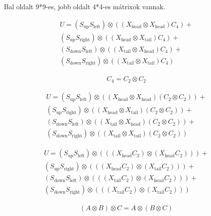 Bal oldalt 9*9-es, jobb oldalt 4*4-es mátrixok vannak.

\begin{align}
  U =
  (S_{\text{up}}  S_{\text{left}}) \otimes ((X_{\text{head}} \otimes X_{\text{head}})  C_4) +   \\
  (S_{\text{up}}  S_{\text{right}}) \otimes ((X_{\text{head}} \otimes X_{\text{tail}}) C_4) +   \\
  (S_{\text{down}}  S_{\text{left}}) \otimes ((X_{\text{tail}} \otimes X_{\text{head}})  C_4) + \\
  (S_{\text{down}}  S_{\text{right}}) \otimes ((X_{\text{tail}} \otimes X_{\text{tail}}) C_4)
\end{align}

\begin{align}
  C_4 = C_2 \otimes C_2
\end{align}

\begin{align}
  U =
  (S_{\text{up}}  S_{\text{left}}) \otimes ((X_{\text{head}} \otimes X_{\text{head}}) (C_2 \otimes C_2)) +   \\
  (S_{\text{up}}  S_{\text{right}}) \otimes ((X_{\text{head}} \otimes X_{\text{tail}}) (C_2 \otimes C_2)) +  \\
  (S_{\text{down}}  S_{\text{left}}) \otimes ((X_{\text{tail}} \otimes X_{\text{head}}) (C_2 \otimes C_2)) + \\
  (S_{\text{down}}  S_{\text{right}}) \otimes ((X_{\text{tail}} \otimes X_{\text{tail}}) (C_2 \otimes C_2))
\end{align}


\begin{align}
  U =
  (S_{\text{up}}  S_{\text{left}}) \otimes (((X_{\text{head}}C_2) \otimes (X_{\text{head}}C_2))) +   \\
  (S_{\text{up}}  S_{\text{right}}) \otimes (((X_{\text{head}}C_2) \otimes (X_{\text{tail}}C_2))) +  \\
  (S_{\text{down}}  S_{\text{left}}) \otimes (((X_{\text{tail}}C_2) \otimes (X_{\text{head}}C_2))) + \\
  (S_{\text{down}}  S_{\text{right}}) \otimes (((X_{\text{tail}}C_2) \otimes (X_{\text{tail}}C_2)))
\end{align}


\begin{align}
  (A \otimes B) \otimes C = A \otimes (B \otimes C)
\end{align}

